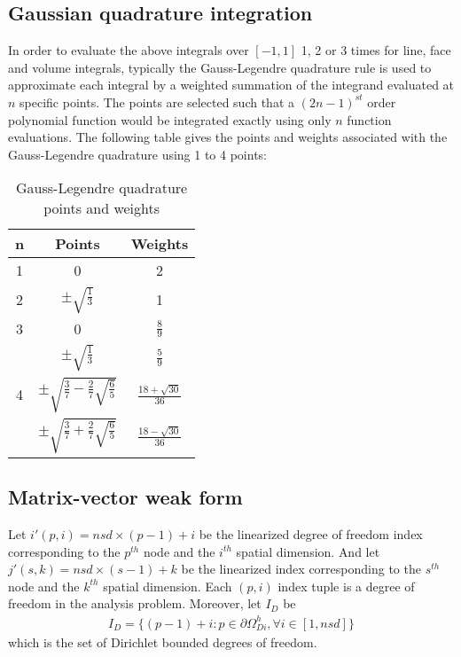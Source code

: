 \subsection{Gaussian quadrature integration}
	In order to evaluate the above integrals over $[-1, 1]$ 1, 2 or 3 times for line, face and volume integrals, typically the Gauss-Legendre quadrature rule is used to approximate each integral by a weighted summation of the integrand evaluated at $n$ specific points. The points are selected such that a $(2n-1)^{st}$ order polynomial function would be integrated exactly using only $n$ function evaluations. The following table gives the points and weights associated with the Gauss-Legendre quadrature using 1 to 4 points:

	\begin{table}[!h]
		\centering
		\begin{tabular}{c c c}
		\hline n & Points & Weights \\
		\hline	1	&	0	&	2 \\
		\hline	2	&	$\pm \sqrt{\frac{1}{3}}$	&	1 \\
		\hline	3	&	0	&	$\frac{8}{9}$ \\
					&	$\pm \sqrt{\frac{1}{3}}$ & $\frac{5}{9}$ \\
		\hline	4	&	$\pm \sqrt{\frac{3}{7}-\frac{2}{7} \sqrt{\frac{6}{5}}}$	&	$\frac{18+\sqrt{30}}{36}$ \\
					&	$\pm \sqrt{\frac{3}{7}+\frac{2}{7} \sqrt{\frac{6}{5}}}$ & 	$\frac{18-\sqrt{30}}{36}$ \\
		\hline
		\end{tabular}
		\caption{Gauss-Legendre quadrature points and weights}
		\label{tab:GaussQuad}
	\end{table}

\subsection{Matrix-vector weak form}

	Let $i'(p,i) = nsd \times (p-1) + i$ be the linearized degree of freedom index corresponding to the $p^{th}$ node and the $i^{th}$ spatial dimension. And let $j'(s,k) = nsd \times (s-1) + k$ be the linearized index corresponding to the $s^{th}$ node and the $k^{th}$ spatial dimension. Each $(p,i)$ index tuple is a degree of freedom in the analysis problem. Moreover, let $I_D$ be
	\begin{align}
	    I_D = \{(p-1)+i : p \in \partial \Omega^h_{Di}, \forall i \in [1, nsd]\}
	\end{align}
	which is the set of Dirichlet bounded degrees of freedom.

